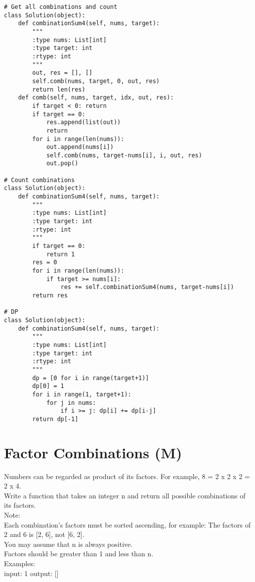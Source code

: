 \begin{lstlisting}
# Get all combinations and count
class Solution(object):
    def combinationSum4(self, nums, target):
        """
        :type nums: List[int]
        :type target: int
        :rtype: int
        """
        out, res = [], []
        self.comb(nums, target, 0, out, res)
        return len(res)
    def comb(self, nums, target, idx, out, res):
        if target < 0: return
        if target == 0:
            res.append(list(out))
            return
        for i in range(len(nums)):
            out.append(nums[i])
            self.comb(nums, target-nums[i], i, out, res)
            out.pop()

# Count combinations
class Solution(object):
    def combinationSum4(self, nums, target):
        """
        :type nums: List[int]
        :type target: int
        :rtype: int
        """
        if target == 0:
            return 1
        res = 0
        for i in range(len(nums)):
            if target >= nums[i]:
                res += self.combinationSum4(nums, target-nums[i])
        return res
    
# DP
class Solution(object):
    def combinationSum4(self, nums, target):
        """
        :type nums: List[int]
        :type target: int
        :rtype: int
        """
        dp = [0 for i in range(target+1)]
        dp[0] = 1
        for i in range(1, target+1):
            for j in nums:
                if i >= j: dp[i] += dp[i-j]
        return dp[-1]
\end{lstlisting}


\section{Factor Combinations (M)}
Numbers can be regarded as product of its factors. For example, 8 = 2 x 2 x 2 = 2 x 4.\\

Write a function that takes an integer n and return all possible combinations of its factors.\\

Note: \\
    Each combination's factors must be sorted ascending, for example: The factors of 2 and 6 is [2, 6], not [6, 2].\\
    You may assume that n is always positive.\\
    Factors should be greater than 1 and less than n.\\

Examples: \\
input: 1
output: 
[]\\


